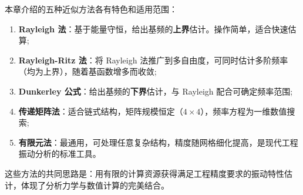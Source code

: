 本章介绍的五种近似方法各有特色和适用范围：

\begin{enumerate}
    \item \textbf{Rayleigh 法}：基于能量守恒，给出基频的\textbf{上界}估计。操作简单，适合快速估算;
    \item \textbf{Rayleigh-Ritz 法}：将 Rayleigh 法推广到多自由度，可同时估计多阶频率（均为上界），随着基函数增多而收敛;
    \item \textbf{Dunkerley 公式}：给出基频的\textbf{下界}估计，与 Rayleigh 配合可确定频率范围;
    \item \textbf{传递矩阵法}：适合链式结构，矩阵规模恒定（$4\times4$），频率方程为一维数值搜索;
    \item \textbf{有限元法}：最通用，可处理任意复杂结构，精度随网格细化提高，是现代工程振动分析的标准工具。
\end{enumerate}

这些方法的共同思路是：用有限的计算资源获得满足工程精度要求的振动特性估计，体现了分析力学与数值计算的完美结合。


